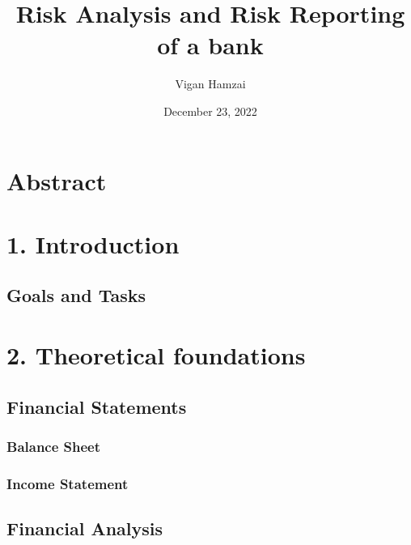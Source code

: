 \documentclass[
  12pt,
]{article}
\title{Risk Analysis and Risk Reporting of a bank}
\author{Vigan Hamzai}
\date{December 23, 2022}
\begin{document}
\maketitle

{
\setcounter{tocdepth}{3}
\tableofcontents
}
\newpage

\hypertarget{abstract}{%
\section{Abstract}\label{abstract}}

\newpage

\hypertarget{introduction}{%
\section{1. Introduction}\label{introduction}}

\hypertarget{goals-and-tasks}{%
\subsection{Goals and Tasks}\label{goals-and-tasks}}

\newpage

\hypertarget{theoretical-foundations}{%
\section{2. Theoretical foundations}\label{theoretical-foundations}}

\hypertarget{financial-statements}{%
\subsection{Financial Statements}\label{financial-statements}}

\hypertarget{balance-sheet}{%
\subsubsection{Balance Sheet}\label{balance-sheet}}

\hypertarget{income-statement}{%
\subsubsection{Income Statement}\label{income-statement}}

\hypertarget{financial-analysis}{%
\subsection{Financial Analysis}\label{financial-analysis}}
\end{document}
